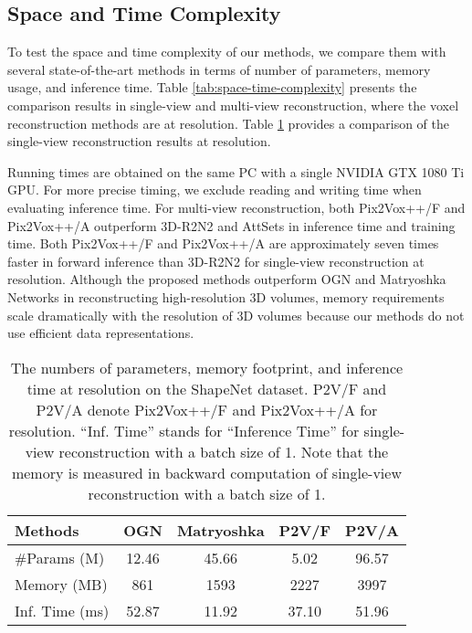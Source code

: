 \documentclass[twocolumn]{svjour3}
\begin{document}
\subsection{Space and Time Complexity}

To test the space and time complexity of our methods, we compare them with several state-of-the-art methods in terms of number of parameters, memory usage, and inference time.
Table \ref{tab:space-time-complexity} presents the comparison results in single-view and multi-view reconstruction, where the voxel reconstruction methods are at  resolution.
Table \ref{tab:space-time-complexity-high-resolution} provides a comparison of the single-view reconstruction results at  resolution.

Running times are obtained on the same PC with a single NVIDIA GTX 1080 Ti GPU.
For more precise timing, we exclude reading and writing time when evaluating inference time.
For multi-view reconstruction, both Pix2Vox++/F and Pix2Vox++/A outperform 3D-R2N2 and AttSets in inference time and training time.
Both Pix2Vox++/F and Pix2Vox++/A are approximately seven times faster in forward inference than 3D-R2N2 for single-view reconstruction at  resolution.
Although the proposed methods outperform OGN \citep{DBLP:conf/iccv/TatarchenkoDB17} and Matryoshka Networks \citep{DBLP:conf/cvpr/Richter018} in reconstructing high-resolution 3D volumes, memory requirements scale dramatically with the resolution of 3D volumes because our methods do not use efficient data representations.

\begin{table}
  \caption{The numbers of parameters, memory footprint, and inference time at  resolution on the ShapeNet dataset. P2V/F and P2V/A denote Pix2Vox++/F and Pix2Vox++/A for  resolution. ``Inf. Time'' stands for ``Inference Time'' for single-view reconstruction with a batch size of 1. Note that the memory is measured in backward computation of single-view reconstruction with a batch size of 1.}
  \centering
  \begin{tabularx}{\linewidth}{lcccc}
  \toprule
  Methods         & OGN         & Matryoshka
                  & P2V/F       & P2V/A \\
  \midrule
  \#Params (M)    & 12.46       & 45.66
                  & 5.02        & 96.57 \\
  Memory (MB)     & 861         & 1593
                  & 2227        & 3997 \\
  Inf. Time (ms)  & 52.87       & 11.92
                  & 37.10       & 51.96 \\
  \bottomrule
  \end{tabularx}
  \label{tab:space-time-complexity-high-resolution}
\end{table}
\end{document}

